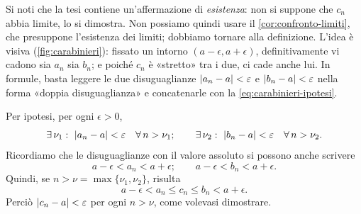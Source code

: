 \begin{schema}
\end{schema}

\begin{strategia}
Si noti che la tesi contiene un'affermazione di \emph{esistenza}: non si suppone che
$c_{n}$ abbia limite, lo si dimostra. Non possiamo quindi usare il
\cref{cor:confronto-limiti}, che presuppone l'esistenza dei limiti; dobbiamo tornare alla
definizione. L'idea è visiva (\cref{fig:carabinieri}): fissato un intorno
$(a-\epsilon,a+\epsilon)$, definitivamente vi cadono sia $a_{n}$ sia $b_{n}$; e poiché
$c_{n}$ è «stretto» tra i due, ci cade anche lui. In formule, basta leggere le due
disuguaglianze $\lvert a_{n}-a\rvert<\varepsilon$ e $\lvert b_{n}-a\rvert<\varepsilon$ nella forma «doppia
disuguaglianza» e concatenarle con la \eqref{eq:carabinieri-ipotesi}.
\end{strategia}

\begin{dimostrazione}
Per ipotesi, per ogni $\epsilon>0$,
\begin{equation}\label{eq:carabinieri-passo1}
  \exists\,\nu_{1}:\ \lvert a_{n}-a\rvert<\varepsilon\quad\forall\, n>\nu_{1}; \qquad
  \exists\,\nu_{2}:\ \lvert b_{n}-a\rvert<\varepsilon\quad\forall\, n>\nu_{2}.
\end{equation}
Ricordiamo che le disuguaglianze con il valore assoluto si possono anche scrivere
\begin{equation}\label{eq:carabinieri-passo2}
  a-\epsilon<a_{n}<a+\epsilon; \qquad a-\epsilon<b_{n}<a+\epsilon .
\end{equation}
Quindi, se $n>\nu=\max\{\nu_{1},\nu_{2}\}$, risulta
\begin{equation}\label{eq:carabinieri-passo3}
  a-\epsilon<a_{n}\le c_{n}\le b_{n}<a+\epsilon .
\end{equation}
Perciò $\lvert c_{n}-a\rvert<\varepsilon$ per ogni $n>\nu$, come volevasi dimostrare.
\end{dimostrazione}


